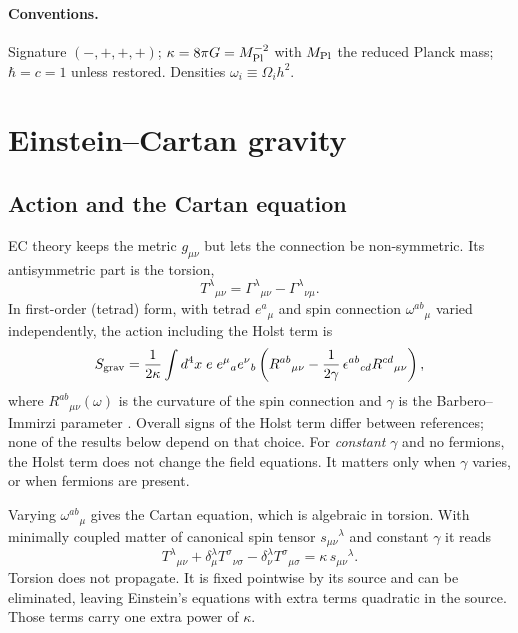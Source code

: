 \documentclass[11pt]{article}
\newcommand{\Mp}{M_{\rm Pl}}
\begin{document}
\paragraph{Conventions.} Signature $(-,+,+,+)$; $\kappa=8\pi G=\Mp^{-2}$ with $\Mp$ the
reduced Planck mass; $\hbar=c=1$ unless restored. Densities $\omega_i\equiv\Omega_ih^2$.

\section{Einstein--Cartan gravity}\label{sec:ec}

\subsection{Action and the Cartan equation}
EC theory keeps the metric $g_{\mu\nu}$ but lets the connection be non-symmetric. Its
antisymmetric part is the torsion,
\begin{equation}
T^\lambda{}_{\mu\nu}=\Gamma^\lambda{}_{\mu\nu}-\Gamma^\lambda{}_{\nu\mu}.
\end{equation}
In first-order (tetrad) form, with tetrad $e^a{}_\mu$ and spin connection
$\omega^{ab}{}_\mu$ varied independently, the action including the Holst term is
\cite{holst1996}
\begin{equation}
S_{\rm grav}=\frac{1}{2\kappa}\int d^4x\;e\;e^\mu{}_a e^\nu{}_b
\left(R^{ab}{}_{\mu\nu}-\frac{1}{2\gamma}\,\epsilon^{ab}{}_{cd}R^{cd}{}_{\mu\nu}\right),
\label{eq:holst}
\end{equation}
where $R^{ab}{}_{\mu\nu}(\omega)$ is the curvature of the spin connection and $\gamma$ is
the Barbero--Immirzi parameter \cite{barbero1995,immirzi1997}. Overall signs of the
Holst term differ between references; none of the results below depend on that choice.
For \emph{constant} $\gamma$ and no fermions, the Holst term does not change the field
equations. It matters only when $\gamma$ varies, or when fermions are present.

Varying $\omega^{ab}{}_\mu$ gives the Cartan equation, which is algebraic in torsion. With
minimally coupled matter of canonical spin tensor $s_{\mu\nu}{}^\lambda$ and constant
$\gamma$ it reads \cite{hehl1976}
\begin{equation}
T^\lambda{}_{\mu\nu}+\delta^\lambda_\mu T^\sigma{}_{\nu\sigma}
-\delta^\lambda_\nu T^\sigma{}_{\mu\sigma}=\kappa\,s_{\mu\nu}{}^{\lambda}.
\label{eq:cartan}
\end{equation}
Torsion does not propagate. It is fixed pointwise by its source and can be eliminated,
leaving Einstein's equations with extra terms quadratic in the source. Those terms carry
one extra power of $\kappa$.
\end{document}
